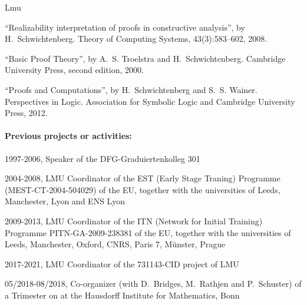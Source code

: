 \begin{sitedescription}{Lmu}
\begin{compactitem}
\item ``Realizability interpretation of proofs in constructive analysis'',
  by H.~Schwichtenberg.
 Theory of Computing Systems, 43(3):583--602, 2008.

\item ``Basic Proof Theory'',
  by A.~S. Troelstra and H.~Schwichtenberg.
 Cambridge University Press, second edition, 2000.

\item ``Proofs and Computations'',
  by H.~Schwichtenberg and S.~S. Wainer.
Perspectives in Logic. Association for Symbolic Logic and Cambridge
  University Press, 2012.
\end{compactitem}

\paragraph*{Previous projects or activities:}

\begin{compactitem}
  \item 1997-2006, Speaker of the DFG-Graduiertenkolleg 301

\item 2004-2008, LMU Coordinator of the  EST (Early Stage Traning) Programme
   (MEST-CT-2004-504029) of the EU, together with the
universities of Leeds, Manchester, Lyon and ENS Lyon

\item 2009-2013, LMU Coordinator of the ITN (Network for Initial
    Training) Programme PITN-GA-2009-238381  of the
    EU, together with the universities of Leeds, Manchester, Oxford,
    CNRS, Paris 7, M\"unster, Prague

\item 2017-2021, LMU Coordinator of the 731143-CID project of LMU

\item 05/2018-08/2018, Co-organizer (with D.~Bridges, M.~Rathjen and
  P.~Schuster) of a Trimester on 
  at the Hausdorff Institute for Mathematics, Bonn
\end{compactitem}



\end{sitedescription}
